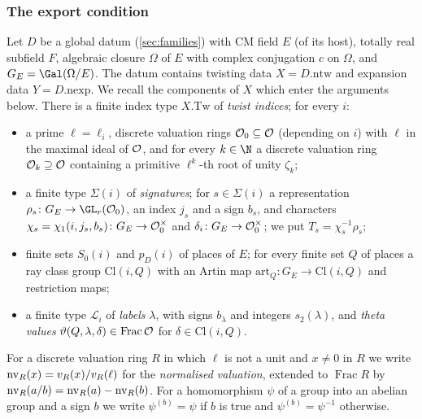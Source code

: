 \subsubsection{The export condition}

Let $D$ be a global datum (\cref{sec:families}) with CM field $E$ (of its host), totally real subfield $F$,
algebraic closure $\Omega$ of $E$ with complex conjugation $c$ on $\Omega$, and $G_E=\Gal(\Omega/E)$. The
datum contains twisting data $X=D.\mathrm{ntw}$ and expansion data $Y=D.\mathrm{nexp}$. We recall the components
of $X$ which enter the arguments below. There is a finite index type $X.\mathrm{Tw}$ of \emph{twist indices};
for every $i$:
\begin{itemize}
\item a prime $\ell=\ell_i$, discrete valuation rings $\mathcal O_0\subseteq\mathcal O$ (depending on $i$)
  with $\ell$ in the maximal ideal of $\mathcal O$, and for every $k\in\N$ a discrete valuation ring
  $\mathcal O_k\supseteq\mathcal O$ containing a primitive $\ell^k$-th root of unity $\zeta_k$;
\item a finite type $\Sigma(i)$ of \emph{signatures}; for $s\in\Sigma(i)$ a representation
  $\rho_s\colon G_E\to\GL_r(\baselatoneO_0)$, an index $j_s$ and a sign $b_s$, and characters
  $\chi_s=\chi_1(i,j_s,b_s)\colon G_E\to\mathcal O_0^\times$ and $\delta_i\colon G_E\to\mathcal O_0^\times$;
  we put $T_s=\chi_s^{-1}\rho_s$;
\item finite sets $S_0(i)$ and $p_D(i)$ of places of $E$; for every finite set $Q$ of places a ray class group
  $\mathrm{Cl}(i,Q)$ with an Artin map $\mathrm{art}_Q\colon G_E\to\mathrm{Cl}(i,Q)$ and restriction maps;
\item a finite type $\mathcal L_i$ of \emph{labels} $\lambda$, with signs $b_\lambda$ and integers
  $s_2(\lambda)$, and \emph{theta values} $\vartheta(Q,\lambda,\delta)\in\operatorname{Frac}\mathcal O$ for
  $\delta\in\mathrm{Cl}(i,Q)$.
\end{itemize}
For a discrete valuation ring $R$ in which $\ell$ is not a unit and $x\ne0$ in $R$ we write
$\operatorname{nv}_R(x)=v_R(x)/v_R(\ell)$ for the \emph{normalised valuation}, extended to
$\operatorname{Frac}R$ by $\operatorname{nv}_R(a/b)=\operatorname{nv}_R(a)-\operatorname{nv}_R(b)$. For a homomorphism
$\psi$ of a group into an abelian group and a sign $b$ we write $\psi^{(b)}=\psi$ if $b$ is true and
$\psi^{(b)}=\psi^{-1}$ otherwise.

